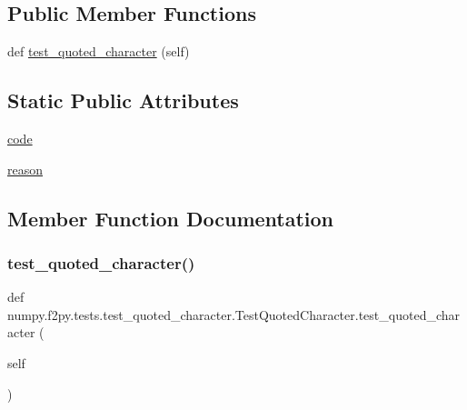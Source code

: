 \subsection*{Public Member Functions}
\begin{DoxyCompactItemize}
\item 
def \hyperlink{classnumpy_1_1f2py_1_1tests_1_1test__quoted__character_1_1TestQuotedCharacter_aac3b0ff1c3c61e863056a0189c4e247c}{test\+\_\+quoted\+\_\+character} (self)
\end{DoxyCompactItemize}
\subsection*{Static Public Attributes}
\begin{DoxyCompactItemize}
\item 
\hyperlink{classnumpy_1_1f2py_1_1tests_1_1test__quoted__character_1_1TestQuotedCharacter_aba94f4fd0eb8cde71969bd910996ab0d}{code}
\item 
\hyperlink{classnumpy_1_1f2py_1_1tests_1_1test__quoted__character_1_1TestQuotedCharacter_a29c973c4fa500918c9e58365ba515675}{reason}
\end{DoxyCompactItemize}


\subsection{Member Function Documentation}
\mbox{\label{classnumpy_1_1f2py_1_1tests_1_1test__quoted__character_1_1TestQuotedCharacter_aac3b0ff1c3c61e863056a0189c4e247c}} 
\subsubsection{\texorpdfstring{test\+\_\+quoted\+\_\+character()}{test\_quoted\_character()}}
{\footnotesize\ttfamily def numpy.\+f2py.\+tests.\+test\+\_\+quoted\+\_\+character.\+Test\+Quoted\+Character.\+test\+\_\+quoted\+\_\+character (\begin{DoxyParamCaption}\item[{}]{self }\end{DoxyParamCaption})}



